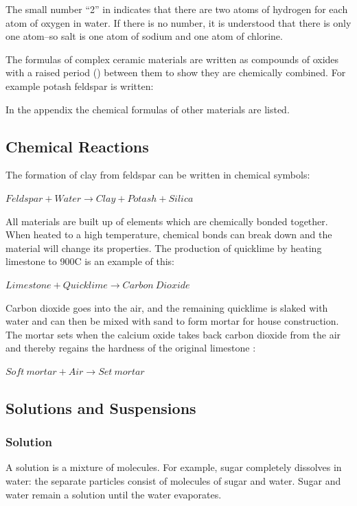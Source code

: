 The small number ``2'' in  indicates that there are two atoms of 
hydrogen 
for each atom of oxygen in water. If there is no number, it is understood that 
there is only one atom--so salt is one atom of sodium and one atom of chlorine.

The formulas of complex ceramic materials are written as compounds of oxides 
with a raised period (\ce{*}) between them to show they are chemically combined. For 
example potash feldspar is written:


In the appendix the chemical formulas of other materials are listed.
\subsection{Chemical Reactions}
The formation of clay from feldspar can be written in chemical symbols:


$Feldspar + Water \rightarrow Clay + Potash + Silica$

All materials are built up of elements which are chemically bonded together. 
When heated to a high temperature, chemical bonds can break down and the 
material will change its properties. The production of quicklime by heating 
limestone to 900\degree C is an example of this:


$Limestone + Quicklime \rightarrow Carbon~Dioxide$

Carbon dioxide  goes into the air, and the remaining quicklime 
 is slaked with water and can then be mixed with sand to form mortar 
for house construction. The mortar sets when the calcium oxide  takes 
back carbon dioxide  from the air and thereby regains the hardness of 
the original limestone :



$Soft~mortar + Air \rightarrow Set~mortar$
\subsection{Solutions and Suspensions}
\subsubsection{Solution}
A solution is a mixture of molecules. For example, sugar completely dissolves 
in water: the separate particles consist of molecules of sugar and water. Sugar 
and water remain a solution until the water evaporates.


